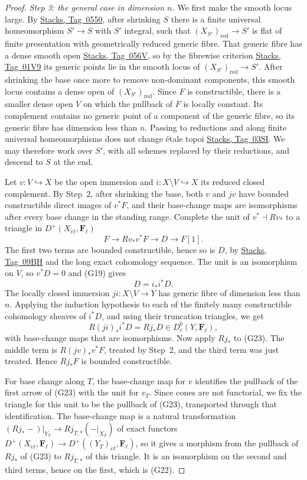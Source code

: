 \documentclass[11pt,a4paper]{article}
\numberwithin{equation}{section}
\theoremstyle{definition}
\theoremstyle{remark}
\newcommand{\Dbc}{D^b_c}
\newcommand{\Fell}{\mathbf F_\ell}
\newcommand{\et}{\acute{e}t}
\newcommand{\stacks}[1]{\href{https://stacks.math.columbia.edu/tag/#1}{\textnormal{Stacks, Tag~#1}}}
\begin{document}
\begin{proof}
\emph{Step 3: the general case in dimension \(n\).} We first make the
smooth locus large. By \stacks{0550}, after shrinking \(S\) there is a
finite universal homeomorphism \(S'\to S\) with \(S'\) integral, such
that \((X_{S'})_{\mathrm{red}}\to S'\) is flat of finite presentation
with geometrically reduced generic fibre. That generic fibre has a dense
smooth open \stacks{056V}, so by the fibrewise criterion \stacks{01V9}
its generic points lie in the smooth locus of
\((X_{S'})_{\mathrm{red}}\to S'\). After shrinking the base once more to
remove non-dominant components, this smooth locus contains a dense open
of \((X_{S'})_{\mathrm{red}}\). Since \(F\) is constructible, there is a
smaller dense open \(V\) on which the pullback of \(F\) is locally
constant. Its complement contains no generic point of a component of
the generic fibre, so its generic fibre has dimension less than \(n\).
Passing to reductions and along finite universal homeomorphisms does
not change \'etale topoi \stacks{03SI}. We may therefore work over
\(S'\), with all schemes replaced by their reductions, and descend to
\(S\) at the end.

Let \(v:V\hookrightarrow X\) be the open immersion and
\(i:X\setminus V\hookrightarrow X\) its reduced closed complement. By
Step~2, after shrinking the base, both \(v\) and \(jv\) have bounded
constructible direct images of \(v^*F\), and their base-change maps are
isomorphisms after every base change in the standing range. Complete the unit of
\(v^*\dashv Rv_*\) to a triangle in \(D^+(X_{\et},\Fell)\)
\[
 F\longrightarrow Rv_*v^*F\longrightarrow D
       \longrightarrow F[1].                            \tag{G23}
\]
The first two terms are bounded constructible, hence so is \(D\), by
\stacks{09BH} and the long exact cohomology sequence. The unit is an
isomorphism on \(V\), so \(v^*D=0\) and (G19) gives
\[
 D=i_*i^*D.                                              \tag{G24}
\]
The locally closed immersion \(ji:X\setminus V\to Y\) has generic fibre
of dimension less than \(n\). Applying the induction hypothesis to each
of the finitely many constructible cohomology sheaves of \(i^*D\), and
using their truncation triangles, we get
\[
 R(ji)_*i^*D=Rj_*D\in\Dbc(Y,\Fell),
\]
with base-change maps that are isomorphisms. Now apply \(Rj_*\) to
(G23). The middle term is \(R(jv)_*v^*F\), treated by Step~2, and the
third term was just treated. Hence \(Rj_*F\) is bounded constructible.

For base change along \(T\), the base-change map for \(v\) identifies
the pullback of the first arrow of (G23) with the unit for \(v_T\).
Since cones are not functorial, we fix the triangle for this unit to be
the pullback of (G23), transported through that identification. The
base-change map is a natural transformation
\((Rj_*-)|_{Y_T}\to Rj_{T,*}(-|_{X_T})\) of exact functors
\(D^+(X_{\et},\Fell)\to D^+((Y_T)_{\et},\Fell)\), so it
gives a morphism from the pullback of \(Rj_*\) of (G23) to \(Rj_{T,*}\)
of this triangle. It is an isomorphism on the second and third terms,
hence on the first, which is (G22).


\end{proof}
\end{document}
